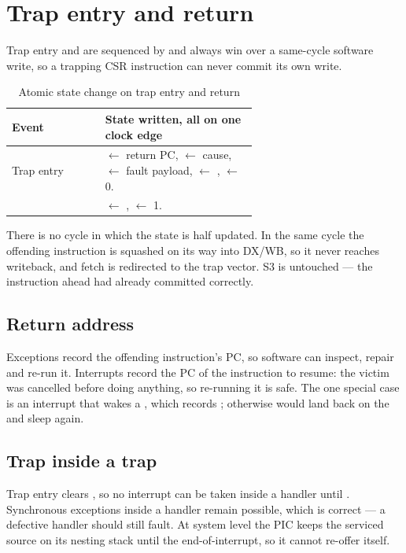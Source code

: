 \section{Trap entry and return}

Trap entry and  are sequenced by  and always win over a
same-cycle software write, so a trapping CSR instruction can never commit its own
write.

\begin{table}[H]
\centering
\caption{Atomic state change on trap entry and return}
\label{tab:trapseq}
\begin{tabular}{@{}lL{0.62\linewidth}@{}}
\toprule
\textbf{Event} & \textbf{State written, all on one clock edge} \\
\midrule
Trap entry &  $\leftarrow$ return PC,  $\leftarrow$ cause,
              $\leftarrow$ fault payload,  $\leftarrow$ ,
              $\leftarrow$ 0. \\
 &  $\leftarrow$ ,  $\leftarrow$ 1. \\
\bottomrule
\end{tabular}
\end{table}

There is no cycle in which the state is half updated. In the same cycle the
offending instruction is squashed on its way into DX/WB, so it never reaches
writeback, and fetch is redirected to the trap vector. S3 is untouched --- the
instruction ahead had already committed correctly.

\subsection{Return address}

Exceptions record the offending instruction's PC, so software can inspect, repair
and re-run it. Interrupts record the PC of the instruction to resume: the victim
was cancelled before doing anything, so re-running it is safe. The one special
case is an interrupt that wakes a , which records ; otherwise
 would land back on the  and sleep again.

\subsection{Trap inside a trap}

Trap entry clears , so no interrupt can be taken inside a handler until
. Synchronous exceptions inside a handler remain possible, which is
correct --- a defective handler should still fault. At system level the PIC keeps
the serviced source on its nesting stack until the end-of-interrupt, so it cannot
re-offer itself.

